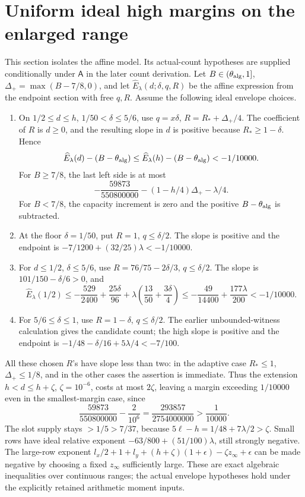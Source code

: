 \documentclass[12pt]{article}
\begin{document}
\section{Uniform ideal high margins on the enlarged range}
This section isolates the affine model.  Its actual-count hypotheses
are supplied conditionally under \(\mathsf A\) in the later count derivation.
Let \(B\in(\theta_{\rm alg},1]\),
\(\Delta_+=\max(B-7/8,0)\), and let \(\widehat E_\lambda(d;\delta,q,R)\)
be the affine expression from the endpoint section with free \(q,R\).
Assume the following ideal envelope choices.
\begin{enumerate}
\item On \(1/2\le d\le h\), \(1/50<\delta\le5/6\), use
\(q=x\delta\), \(R=R_*+\Delta_+/4\).
The coefficient of \(R\) is \(d\ge0\), and the resulting slope in \(d\)
is positive because \(R_*\ge1-\delta\).  Hence
\[
 \widehat E_\lambda(d)-(B-\theta_{\rm alg})
 \le \widehat E_\lambda(h)-(B-\theta_{\rm alg})
 <-1/10000.
\]
For \(B\ge7/8\), the last left side is at most
\[
 -\frac{59873}{550800000}
   -(1-h/4)\Delta_+-\lambda/4.
\]
For \(B<7/8\), the capacity increment is zero and the positive
\(B-\theta_{\rm alg}\) is subtracted.
\item At the floor \(\delta=1/50\), put \(R=1\), \(q\le\delta/2\).
The slope is positive and the endpoint is
\(-7/1200+(32/25)\lambda<-1/10000\).
\item For \(d\le1/2\), \(\delta\le5/6\), use
\(R=76/75-2\delta/3\), \(q\le\delta/2\).
The slope is \(101/150-\delta/6>0\), and
\[
 \widehat E_\lambda(1/2)
 \le-\frac{529}{2400}+\frac{25\delta}{96}
       +\lambda\left(\frac{13}{50}+\frac{3\delta}{4}\right)
 \le-\frac{49}{14400}+\frac{177\lambda}{200}
 <-1/10000.
\]
\item For \(5/6\le\delta\le1\), use \(R=1-\delta\),
\(q\le\delta/2\).  The earlier unbounded-witness calculation gives
the candidate count; the high slope is positive and the endpoint is
\(-1/48-\delta/16+5\lambda/4<-7/100\).
\end{enumerate}
All these chosen \(R\)'s have slope less than two:
in the adaptive case \(R_*\le1\), \(\Delta_+\le1/8\), and in
the other cases the assertion is immediate.
Thus the extension \(h<d\le h+\zeta\), \(\zeta=10^{-6}\),
costs at most \(2\zeta\), leaving a margin exceeding \(1/10000\)
even in the smallest-margin case, since
\[
 \frac{59873}{550800000}-\frac2{10^6}
   =\frac{293857}{2754000000}>\frac1{10000}.
\]
The slot supply stays \(>1/5>7/37\), because
\(5\ell-h=1/48+7\lambda/2>\zeta\).
Small rows have ideal relative exponent
\(-63/800+(51/100)\lambda\), still strongly negative.
The large-row exponent
\(l_x/2+1+l_y+(h+\zeta)(1+\epsilon)-\zeta z_\infty+\epsilon\)
can be made negative by choosing a fixed \(z_\infty\) sufficiently large.
These are exact algebraic inequalities over continuous ranges;
the actual envelope hypotheses hold under the explicitly retained
arithmetic moment inputs.
\end{document}
